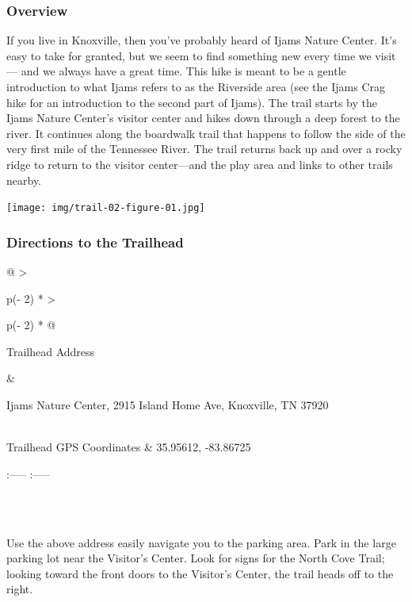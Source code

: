 \documentclass[
  letterpaper,
  DIV=11,
  numbers=noendperiod]{scrartcl}
\begin{document}
\hypertarget{overview-1}{%
\subsubsection{Overview}\label{overview-1}}

If you live in Knoxville, then you've probably heard of Ijams Nature
Center. It's easy to take for granted, but we seem to find something new
every time we visit --- and we always have a great time. This hike is
meant to be a gentle introduction to what Ijams refers to as the
Riverside area (see the Ijams Crag hike for an introduction to the
second part of Ijams). The trail starts by the Ijams Nature Center's
visitor center and hikes down through a deep forest to the river. It
continues along the boardwalk trail that happens to follow the side of
the very first mile of the Tennessee River. The trail returns back up
and over a rocky ridge to return to the visitor center---and the play
area and links to other trails nearby.

\texttt{[image: img/trail-02-figure-01.jpg]}

\hypertarget{directions-to-the-trailhead-1}{%
\subsubsection{Directions to the
Trailhead}\label{directions-to-the-trailhead-1}}

\begin{longtable}[]{@{}
  >{\raggedright\arraybackslash}p{(\columnwidth - 2\tabcolsep) * }
  >{\raggedright\arraybackslash}p{(\columnwidth - 2\tabcolsep) * }@{}}
\toprule\noalign{}
\begin{minipage}[b]{\linewidth}\raggedright
Trailhead Address
\end{minipage} & \begin{minipage}[b]{\linewidth}\raggedright
Ijams Nature Center, 2915 Island Home Ave, Knoxville, TN 37920
\end{minipage} \\
\midrule\noalign{}
\endhead
\bottomrule\noalign{}
\endlastfoot
Trailhead GPS Coordinates & 35.95612, -83.86725 \\
\end{longtable}

:----- \textbar{} :----- \textbar{}\\
\strut \\
\strut \\
\hspace*{0.333em}\textbar{} Use the above address easily navigate you to
the parking area. Park in the large parking lot near the Visitor's
Center. Look for signs for the North Cove Trail; looking toward the
front doors to the Visitor's Center, the trail heads off to the right.
\textbar{}\\
\strut \\
\end{document}
